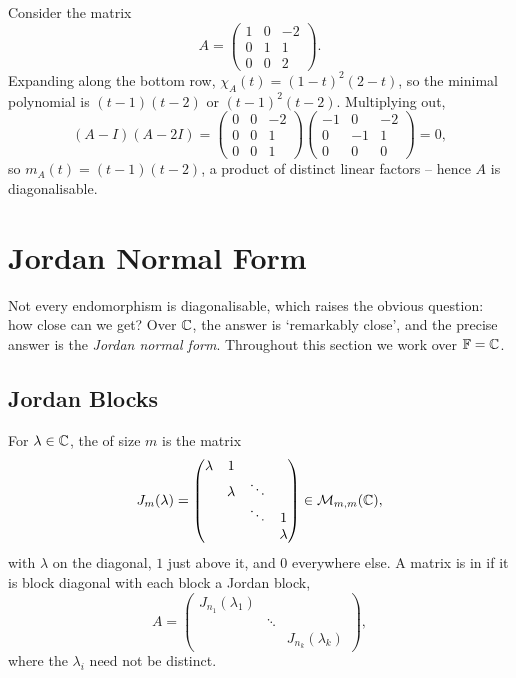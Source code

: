 \documentclass[a4paper]{scrartcl}
\begin{document}
\begin{example}
    Consider the matrix
    $$
    A = \begin{pmatrix}
        1 & 0 & -2 \\
        0 & 1 & 1 \\
        0 & 0 & 2
    \end{pmatrix}.
    $$
    Expanding along the bottom row, $\chi_A(t) = (1 - t)^2(2 - t)$, so the minimal polynomial is $(t-1)(t-2)$ or $(t-1)^2(t-2)$. Multiplying out,
    $$
    (A - I)(A - 2I) = \begin{pmatrix}
        0 & 0 & -2 \\ 0 & 0 & 1 \\ 0 & 0 & 1
    \end{pmatrix}\begin{pmatrix}
        -1 & 0 & -2 \\ 0 & -1 & 1 \\ 0 & 0 & 0
    \end{pmatrix} = 0,
    $$
    so $m_A(t) = (t - 1)(t- 2)$, a product of distinct linear factors -- hence $A$ is diagonalisable.
\end{example}

\section{Jordan Normal Form}

Not every endomorphism is diagonalisable, which raises the obvious question: how close can we get? Over $\mathbb{C}$, the answer is `remarkably close', and the precise answer is the \emph{Jordan normal form}. Throughout this section we work over $\mathbb{F} = \mathbb{C}$.

\subsection{Jordan Blocks}

\begin{definition}
    For $\lambda \in \mathbb{C}$, the  of size $m$ is the matrix
    $$
    J_m(\lambda) = \begin{pmatrix}
        \lambda & 1 & & \\
        & \lambda & \ddots & \\
        & & \ddots & 1 \\
        & & & \lambda
    \end{pmatrix} \in \mathcal{M}_{m,m}(\mathbb{C}),
    $$
    with $\lambda$ on the diagonal, $1$ just above it, and $0$ everywhere else.
    A matrix is in  if it is block diagonal with each block a Jordan block,
    $$
    A = \begin{pmatrix}
        J_{n_1}(\lambda_1) & & \\
        & \ddots & \\
        & & J_{n_k}(\lambda_k)
    \end{pmatrix},
    $$
    where the $\lambda_i$ need not be distinct.
\end{definition}
\end{document}
